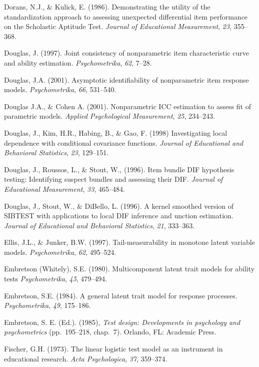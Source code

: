 \documentclass[titlepage,11pt,twoside]{article}
\begin{document}
\begin{thebibliography}
\bibitem Dorans, N.J., \& Kulick, E. (1986). Demonstrating the utility of the standardization approach to assessing unexpected differential item performance on the Scholastic Aptitude Test. \textit{Journal of Educational Measurement}, \textit{23}, 355--368.

\bibitem Douglas, J. (1997). Joint consistency of nonparametric item characteristic curve and ability estimation. \textit{Psychometrika}, \textit{62}, 7--28.

\bibitem Douglas, J.A. (2001). Asymptotic identifiability of nonparametric item response models. \textit{Psychometrika}, \textit{66}, 531--540.

\bibitem Douglas J.A., \& Cohen A. (2001). Nonparametric ICC estimation to assess fit of parametric models. \textit{Applied Psychological Measurement}, \textit{25}, 234--243.

\bibitem Douglas, J., Kim, H.R., Habing, B., \& Gao, F. (1998) Investigating local dependence with conditional covariance functions. \textit{Journal of Educational and Behavioral Statistics}, \textit{23}, 129--151.

\bibitem Douglas, J., Roussos, L., \& Stout, W., (1996). Item bundle DIF hypothesis testing: Identifying suspect bundles and assessing their DIF. \textit{Journal of Educational Measurement}, \textit{33}, 465--484.

\bibitem Douglas, J., Stout, W., \& DiBello, L. (1996). A kernel smoothed version of SIBTEST with applications to local DIF inference and unction estimation. \textit{Journal of Educational and Behavioral Statistics}, \textit{21}, 333--363.

\bibitem Ellis, J.L., \& Junker, B.W. (1997). Tail-measurability in monotone latent variable models. \textit{Psychometrika}, \textit{62}, 495--524.

\bibitem Embretson (Whitely), S.E. (1980). Multicomponent latent trait models for ability tests \textit{Psychometrika}, \textit{45}, 479--494.

\bibitem Embretson, S.E. (1984). A general latent trait model for response processes. \textit{Psychometrika}, \textit{49}, 175--186.

\bibitem Embretson, S. E. (Ed.). (1985), \textit{Test design: Developments in psychology and psychometrics} (pp.~195--218, chap.~7). Orlando, FL: Academic Press.

\bibitem Fischer, G.H. (1973). The linear logistic test model as an instrument in educational research. \textit{Acta Psychologica}, \textit{37}, 359--374.


\end{thebibliography}
\end{document}
